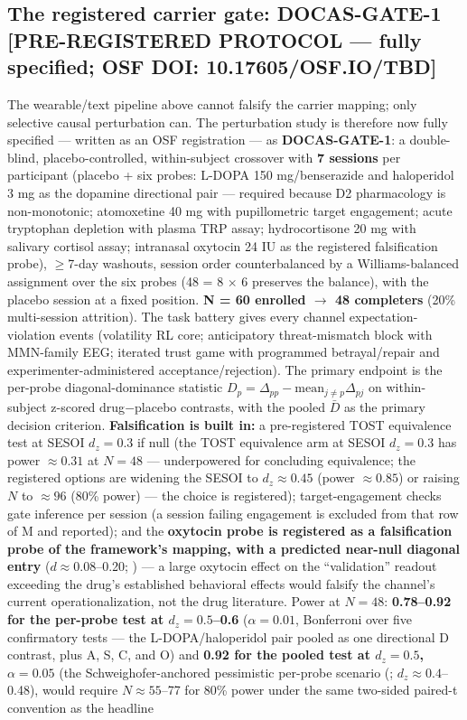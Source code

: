 \documentclass[11pt,twocolumn]{article}
\theoremstyle{plain}
\begin{document}
\subsection{The registered carrier gate: DOCAS-GATE-1 [PRE-REGISTERED PROTOCOL --- fully specified; OSF DOI: {10.17605/OSF.IO/TBD}]}
\label{sec:gate}

The wearable/text pipeline above cannot falsify the carrier mapping; only selective causal perturbation can. The perturbation study is therefore now fully specified --- written as an OSF registration --- as \textbf{DOCAS-GATE-1}: a double-blind, placebo-controlled, within-subject crossover with \textbf{7 sessions} per participant (placebo + six probes: L-DOPA 150 mg/benserazide and haloperidol 3 mg as the dopamine directional pair --- required because D2 pharmacology is non-monotonic; atomoxetine 40 mg with pupillometric target engagement; acute tryptophan depletion with plasma TRP assay; hydrocortisone 20 mg with salivary cortisol assay; intranasal oxytocin 24 IU as the registered falsification probe), \(\geq\)7-day washouts, session order counterbalanced by a Williams-balanced assignment over the six probes (48 = 8 \(\times\) 6 preserves the balance), with the placebo session at a fixed position. \textbf{N = 60 enrolled \(\to\) 48 completers} (20\% multi-session attrition). The task battery gives every channel expectation-violation events (volatility RL core; anticipatory threat-mismatch block with MMN-family EEG; iterated trust game with programmed betrayal/repair and experimenter-administered acceptance/rejection). The primary endpoint is the per-probe diagonal-dominance statistic \(D_p = \Delta_{pp} - \mathrm{mean}_{j \neq p}\Delta_{pj}\) on within-subject z-scored drug\(-\)placebo contrasts, with the pooled \(\bar{D}\) as the primary decision criterion. \textbf{Falsification is built in:} a pre-registered TOST equivalence test at SESOI \(d_z = 0.3\) if null (the TOST equivalence arm at SESOI \(d_z = 0.3\) has power \(\approx 0.31\) at \(N = 48\) --- underpowered for concluding equivalence; the registered options are widening the SESOI to \(d_z \approx 0.45\) (power \(\approx 0.85\)) or raising \(N\) to \(\approx 96\) (80\% power) --- the choice is registered); target-engagement checks gate inference per session (a session failing engagement is excluded from that row of M and reported); and the \textbf{oxytocin probe is registered as a falsification probe of the framework's mapping, with a predicted near-null diagonal entry} (\(d \approx 0.08\)--0.20; \citealp{nave2015,declerck2020}) --- a large oxytocin effect on the ``validation'' readout exceeding the drug's established behavioral effects would falsify the channel's current operationalization, not the drug literature. Power at \(N = 48\): \textbf{0.78--0.92 for the per-probe test at \(d_z = 0.5\)--0.6} (\(\alpha = 0.01\), Bonferroni over five confirmatory tests --- the L-DOPA/haloperidol pair pooled as one directional D contrast, plus A, S, C, and O) and \textbf{0.92 for the pooled test at \(d_z = 0.5\), \(\alpha = 0.05\)} (the Schweighofer-anchored pessimistic per-probe scenario (\citealp{schweighofer2008}; \(d_z \approx 0.4\)--0.48), would require \(N \approx 55\)--77 for 80\% power under the same two-sided paired-t convention as the headline 
\end{document}
